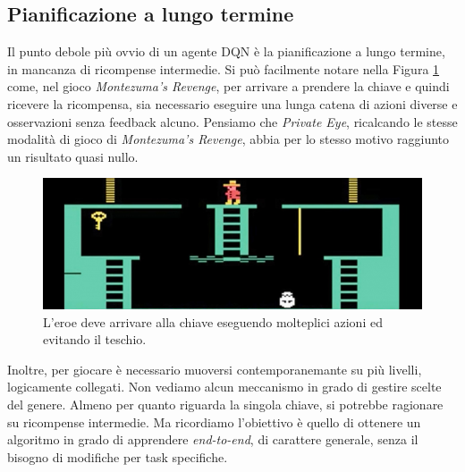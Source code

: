 \documentclass[twoside,twocolumn,10pt]{extarticle}
\theoremstyle{definition}
\begin{document}
	\subsection{Pianificazione a lungo termine}
		Il punto debole più ovvio di un agente DQN è la pianificazione a lungo termine, in mancanza di ricompense intermedie. Si può facilmente notare nella Figura \ref{fig:montezuma} come, nel gioco \textit{Montezuma's Revenge}, per arrivare a prendere la chiave e quindi ricevere la ricompensa, sia necessario eseguire una lunga catena di azioni diverse e osservazioni senza feedback alcuno. Pensiamo che \textit{Private Eye}, ricalcando le stesse modalità di gioco di \textit{Montezuma's Revenge}, abbia per lo stesso motivo raggiunto un risultato quasi nullo.
		\begin{figure}[ht!]
			\centering
			\includegraphics[scale=.31]{images/montezuma.jpg}
			\caption{L'eroe deve arrivare alla chiave eseguendo molteplici azioni ed evitando il teschio.}
			\label{fig:montezuma}
		\end{figure}
		Inoltre, per giocare è necessario muoversi contemporanemante su più livelli, logicamente collegati. Non vediamo alcun meccanismo in grado di gestire scelte del genere. Almeno per quanto riguarda la singola chiave, si potrebbe ragionare su ricompense intermedie. Ma ricordiamo l'obiettivo è quello di ottenere un algoritmo in grado di apprendere \textit{end-to-end}, di carattere generale, senza il bisogno di modifiche per task specifiche.
		
		
\end{document}
